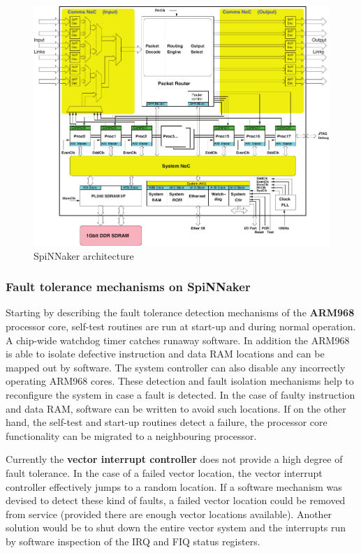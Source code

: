 \documentclass[a4paper, 11pt]{article}
\begin{document}
\begin{figure}[t]
	\centering
	\includegraphics[width=0.7\linewidth]{images/spinnaker_architecture.pdf}
	\caption{SpiNNaker architecture}	
	\label{fig:spin_arch}
\end{figure}

\subsubsection{Fault tolerance mechanisms on SpiNNaker}
Starting by describing the fault tolerance detection mechanisms of the \textbf{ARM968} processor core, self-test routines are run at start-up and during normal operation. A chip-wide watchdog timer catches runaway software. In addition the ARM968 is able to isolate defective instruction and data RAM locations and can be mapped out by software. The system controller can also disable any incorrectly operating ARM968 cores. These detection and fault isolation mechanisms help to reconfigure the system in case a fault is detected. In the case of faulty instruction and data RAM, software can be written to avoid such locations. If on the other hand, the self-test and start-up routines detect a failure, the processor core functionality can be migrated to a neighbouring processor.

Currently the \textbf{vector interrupt controller} does not provide a high degree of fault tolerance. In the case of a failed vector location, the vector interrupt controller effectively jumps to a random location. If a software mechanism was devised to detect these kind of faults, a failed vector location could be removed from service (provided there are enough vector locations available). Another solution would be to shut down the entire vector system and the interrupts run by software inspection of the IRQ and FIQ status registers.
\end{document}
